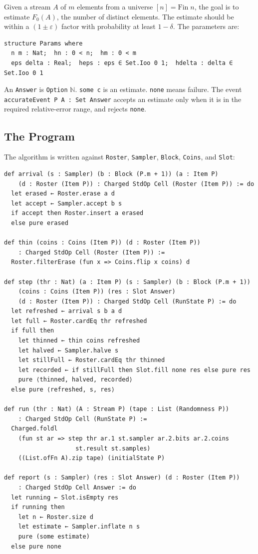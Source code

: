 \documentclass[acmsmall,nonacm]{acmart}
\begin{document}
Given a stream $A$ of $m$ elements from a universe $[n] = \text{Fin}\; n$, the goal is to estimate $F_0(A)$, the number of distinct elements.
The estimate should be within a $(1 \pm \varepsilon)$ factor with probability at least $1 - \delta$.
The parameters are:

\begin{lstlisting}
structure Params where
  n m : Nat;  hn : 0 < n;  hm : 0 < m
  eps delta : Real;  heps : eps ∈ Set.Ioo 0 1;  hdelta : delta ∈ Set.Ioo 0 1
\end{lstlisting}

An \lstinline{Answer} is \lstinline{Option} $\mathbb{N}$.
\lstinline{some c} is an estimate.
\lstinline{none} means failure.
The event \lstinline{accurateEvent P A : Set Answer} accepts an estimate only when it is in the required relative-error range, and rejects \lstinline{none}.

\subsection{The Program}\label{sec:program}

The algorithm is written against \lstinline{Roster}, \lstinline{Sampler}, \lstinline{Block}, \lstinline{Coins}, and \lstinline{Slot}:

\begin{lstlisting}
def arrival (s : Sampler) (b : Block (P.m + 1)) (a : Item P)
    (d : Roster (Item P)) : Charged StdOp Cell (Roster (Item P)) := do
  let erased ← Roster.erase a d
  let accept ← Sampler.accept b s
  if accept then Roster.insert a erased
  else pure erased

def thin (coins : Coins (Item P)) (d : Roster (Item P))
    : Charged StdOp Cell (Roster (Item P)) :=
  Roster.filterErase (fun x => Coins.flip x coins) d

def step (thr : Nat) (a : Item P) (s : Sampler) (b : Block (P.m + 1))
    (coins : Coins (Item P)) (res : Slot Answer)
    (d : Roster (Item P)) : Charged StdOp Cell (RunState P) := do
  let refreshed ← arrival s b a d
  let full ← Roster.cardEq thr refreshed
  if full then
    let thinned ← thin coins refreshed
    let halved ← Sampler.halve s
    let stillFull ← Roster.cardEq thr thinned
    let recorded ← if stillFull then Slot.fill none res else pure res
    pure ⟨thinned, halved, recorded⟩
  else pure ⟨refreshed, s, res⟩

def run (thr : Nat) (A : Stream P) (tape : List (Randomness P))
    : Charged StdOp Cell (RunState P) :=
  Charged.foldl
    (fun st ar => step thr ar.1 st.sampler ar.2.bits ar.2.coins
                    st.result st.samples)
    ((List.ofFn A).zip tape) (initialState P)

def report (s : Sampler) (res : Slot Answer) (d : Roster (Item P))
    : Charged StdOp Cell Answer := do
  let running ← Slot.isEmpty res
  if running then
    let n ← Roster.size d
    let estimate ← Sampler.inflate n s
    pure (some estimate)
  else pure none
\end{lstlisting}
\end{document}
